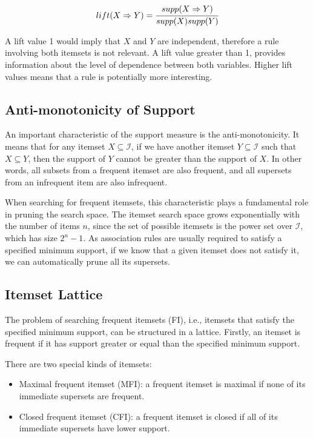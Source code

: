 \begin{equation}
 lift(X \Rightarrow Y)=\cfrac{supp(X \Rightarrow Y)}{supp(X)supp(Y)}
\end{equation}

A lift value 1 would imply that $X$ and $Y$ are independent, therefore a rule involving both itemsets is not relevant.
A lift value greater than 1, provides information about the level of dependence between both variables. Higher
lift values means that a rule is potentially more interesting.

\subsection{Anti-monotonicity of Support}

An important characteristic of the support measure is the anti-monotonicity. It means that for any itemset $X
\subseteq \mathcal{I}$, if we have another itemset $Y \subseteq \mathcal{I}$ such that $X \subseteq Y$, then the
support
of $Y$ cannot be greater than the support of $X$. In other words, all subsets from a frequent itemset are also
frequent,
and all supersets from an infrequent item are also infrequent.

When searching for frequent itemsets, this characteristic plays a fundamental role in pruning the search space. The
itemset search space grows exponentially with the number of items $n$, since the set of possible itemsets is the power
set over $\mathcal{I}$, which has size $2^n-1$. As association rules are usually required to satisfy a specified minimum
support, if we know that a given itemset does not satisfy it, we can automatically prune all its supersets.

\subsection{Itemset Lattice}

The problem of searching frequent itemsets (FI), i.e., itemsets that satisfy the specified minimum support, can be
structured in a lattice. Firstly, an itemset is frequent if it has support greater or equal than the specified minimum
support.

There are two special kinds of itemsets:
\begin{itemize}
 \item Maximal frequent itemset (MFI): a frequent itemset is maximal if none of its immediate supersets are frequent.
 \item Closed frequent itemset (CFI): a frequent itemset is closed if all of its immediate supersets have lower
support.
\end{itemize}


